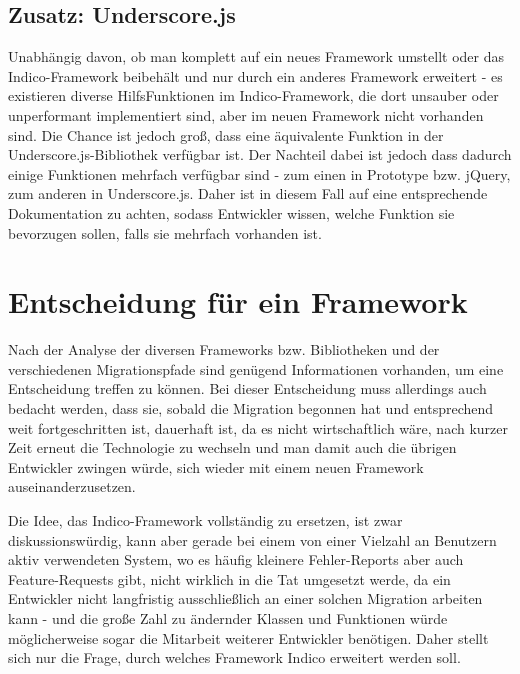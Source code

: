 \subsection{Zusatz: Underscore.js}
Unabhängig davon, ob man komplett auf ein neues Framework umstellt oder das Indico-Framework
beibehält und nur durch ein anderes Framework erweitert - es existieren diverse HilfsFunktionen im
Indico-Framework, die dort unsauber oder unperformant implementiert sind, aber im neuen Framework
nicht vorhanden sind. Die Chance ist jedoch groß, dass eine äquivalente Funktion in der
Underscore.js-Bibliothek verfügbar ist. Der Nachteil dabei ist jedoch dass dadurch einige Funktionen
mehrfach verfügbar sind - zum einen in Prototype bzw. jQuery, zum anderen in Underscore.js. Daher
ist in diesem Fall auf eine entsprechende Dokumentation zu achten, sodass Entwickler wissen, welche
Funktion sie bevorzugen sollen, falls sie mehrfach vorhanden ist.


\section{Entscheidung für ein Framework}

Nach der Analyse der diversen Frameworks bzw. Bibliotheken und der verschiedenen Migrationspfade
sind genügend Informationen vorhanden, um eine Entscheidung treffen zu können. Bei dieser
Entscheidung muss allerdings auch bedacht werden, dass sie, sobald die Migration begonnen hat und
entsprechend weit fortgeschritten ist, dauerhaft ist, da es nicht wirtschaftlich wäre, nach kurzer
Zeit erneut die Technologie zu wechseln und man damit auch die übrigen Entwickler zwingen würde,
sich wieder mit einem neuen Framework auseinanderzusetzen.

Die Idee, das Indico-Framework vollständig zu ersetzen, ist zwar diskussionswürdig, kann aber gerade
bei einem von einer Vielzahl an Benutzern aktiv verwendeten System, wo es häufig kleinere
Fehler-Reports aber auch Feature-Requests gibt, nicht wirklich in die Tat umgesetzt werde, da ein
Entwickler nicht langfristig ausschließlich an einer solchen Migration arbeiten kann - und die große
Zahl zu ändernder Klassen und Funktionen würde möglicherweise sogar die Mitarbeit weiterer
Entwickler benötigen. Daher stellt sich nur die Frage, durch welches Framework Indico erweitert
werden soll.

